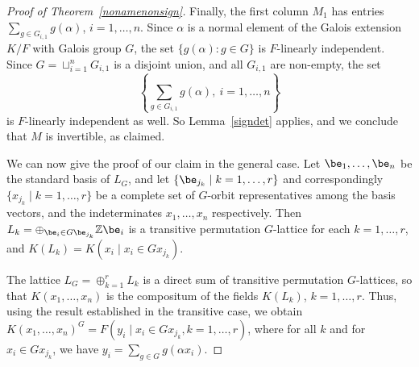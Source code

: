 \documentclass[12pt]{article}
\theoremstyle{plain}
\newcommand{\Z}{\ensuremath{\mathbb{Z}}}
\begin{document}
\begin{proof}[Proof of Theorem~\ref{nonamenonsign}]
  Finally, the first column $M_1$ has entries $\sum_{g \in
      G_{i,1}}g(\alpha)$, $i = 1, \ldots,n$.  Since $\alpha$ is a
  normal element of the Galois extension $K/F$ with Galois group $G$,
  the set $\lbrace g(\alpha): g \in G \rbrace$ is $F$-linearly
  independent. Since $G = \sqcup^n_{i =1}G_{i,1}$ is a disjoint union,
  and all $G_{i,1}$ are non-empty,
  the set
  $$\left\lbrace \sum_{g \in G_{i,1}}g(\alpha),\ i = 1, \ldots, n
  \right\rbrace$$ is $F$-linearly independent as well.  So
  Lemma~\ref{signdet} applies, and we conclude that $M$ is invertible,
  as claimed.

  \medskip 
  
  We can now give the proof of our claim in the general case.  Let
  $\be_1, \ldots , \be_n$ be the standard basis of $L_G$, and let
  $\{\be_{j_k} \mid k = 1, \ldots, r\}$ and correspondingly $\{x_{j_k}
  \mid k = 1, \ldots, r\}$ be a complete set of $G$-orbit
  representatives among the basis vectors, and the indeterminates
  $x_1, \ldots, x_n$ respectively. Then $L_k = \oplus_{ \be_i \in G
    \be_{j_{k}} } \Z \be_i$ is a transitive permutation $G$-lattice
  for each $k = 1, \ldots, r$, and $K(L_k) = K(x_i \mid x_i \in
  Gx_{j_k})$.
  
  The lattice $L_G = \oplus^r_{k =1} L_k$ is a direct sum of transitive
  permutation $G$-lattices, 
  so that $K(x_1,\dots,x_n)$
  is the
  compositum of the fields $K(L_k)$, $k=1,\dots,r$. Thus, using the 
  result established in the transitive case, we obtain
  $K(x_1,\dots,x_n)^G=F(y_i \mid x_i \in Gx_{j_k}, k=1,\dots,r)$, where
  for all $k$ and for $x_i \in Gx_{j_k}$, we have $y_i=\sum_{g \in G}
  g(\alpha x_i)$.
\end{proof}
\end{document}
